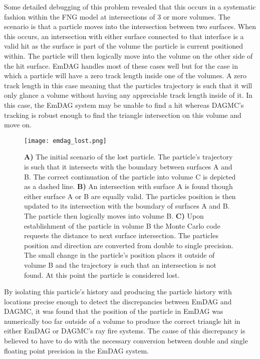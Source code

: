 Some detailed debugging of this problem revealed that this occurs in a
systematic fashion within the FNG model at intersections of 3 or more
volumes. The scenario is that a particle moves into the intersection between two
surfaces. When this occurs, an intersection with either surface connected to
that interface is a valid hit as the surface is part of the volume the
particle is current positioned within. The particle will then logically move
into the volume on the other side of the hit surface. EmDAG handles most of
these cases well but for the case in which a particle will have a zero track
length inside one of the volumes. A zero track length in this case meaning that
the particles trajectory is such that it will only glance a volume without
having any appreciable track length inside of it. In this case, the EmDAG system
may be unable to find a hit whereas DAGMC's tracking is robust enough to find
the triangle intersection on this volume and move on.

\begin{figure}[h!]
  \begin{centering}
    \texttt{[image: emdag\_lost.png]}
    \caption{\textbf{A)} The initial scenario of the lost particle. The
      particle's trajectory is such that it intersects with the boundary between
      surfaces A and B. The correct continuation of the particle into volume C
      is depicted as a dashed line. \textbf{B)} An intersection with surface A
      is found though either surface A or B are equally valid. The particles
      position is then updated to its intersection with the boundary of surfaces
      A and B. The particle then logically moves into volume B. \textbf{C)} Upon
      establishment of the particle in volume B the Monte Carlo code requests
      the distance to next surface intersection. The particles position and
      direction are converted from double to single precision. The small change
      in the particle's position places it outside of volume B and the
      trajectory is such that an intersection is not found. At this point the
      particle is considered lost.}
    \label{emdag-lost-particles}
  \end{centering}
  \end{figure}

By isolating this particle's history and producing the particle history with
locations precise enough to detect the discrepancies between EmDAG and DAGMC, it
was found that the position of the particle in EmDAG was numerically too far
outside of a volume to produce the correct triangle hit in either EmDAG or
DAGMC's ray fire systems. The cause of this discrepancy is believed to have to
do with the necessary conversion between double and single floating point
precision in the EmDAG system.

